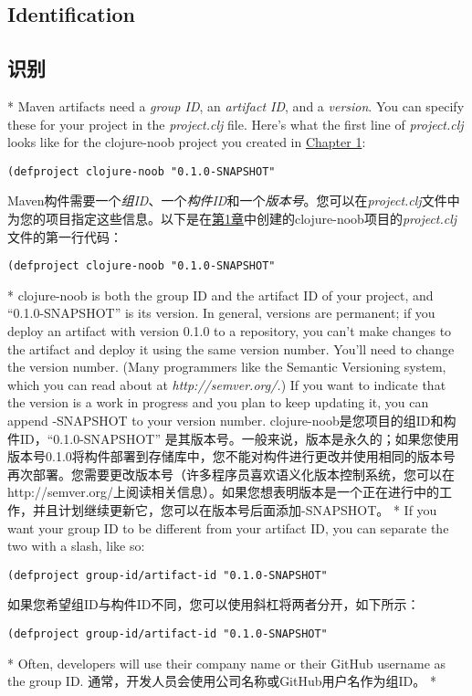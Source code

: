 \begin{paracol}{2}
\subsection{Identification}
\switchcolumn
\subsection{识别}
\switchcolumn[0]*
Maven artifacts need a \emph{group ID}, an \emph{artifact ID}, and a
\emph{version}. You can specify these for your project in the
\emph{project.clj} file. Here's what the first line of
\emph{project.clj} looks like for the clojure-noob project you created
in \href{javascript:void(0)}{Chapter 1}:
\begin{verbatim}
(defproject clojure-noob "0.1.0-SNAPSHOT"
\end{verbatim}
\switchcolumn
Maven构件需要一个\emph{组ID}、一个\emph{构件ID}和一个\emph{版本号}。您可以在\emph{project.clj}文件中为您的项目指定这些信息。以下是在\href{javascript:void(0)}{第1章}中创建的clojure-noob项目的\emph{project.clj}文件的第一行代码：
\begin{verbatim}
(defproject clojure-noob "0.1.0-SNAPSHOT"
\end{verbatim}
\switchcolumn[0]*
clojure-noob is both the group ID and the artifact ID of your project,
and ``0.1.0-SNAPSHOT'' is its version. In general, versions are permanent;
if you deploy an artifact with version 0.1.0 to a repository, you can't
make changes to the artifact and deploy it using the same version
number. You'll need to change the version number. (Many programmers like
the Semantic Versioning system, which you can read about at
\emph{http://semver.org/.}) If you want to indicate that the version is
a work in progress and you plan to keep updating it, you can append
-SNAPSHOT to your version number.
\switchcolumn
clojure-noob是您项目的组ID和构件ID，``0.1.0-SNAPSHOT'' 是其版本号。一般来说，版本是永久的；如果您使用版本号0.1.0将构件部署到存储库中，您不能对构件进行更改并使用相同的版本号再次部署。您需要更改版本号（许多程序员喜欢语义化版本控制系统，您可以在http://semver.org/上阅读相关信息）。如果您想表明版本是一个正在进行中的工作，并且计划继续更新它，您可以在版本号后面添加-SNAPSHOT。
\switchcolumn[0]*
If you want your group ID to be different from your artifact ID, you can
separate the two with a slash, like so:
\begin{verbatim}
(defproject group-id/artifact-id "0.1.0-SNAPSHOT"
\end{verbatim}
\switchcolumn
如果您希望组ID与构件ID不同，您可以使用斜杠将两者分开，如下所示：
\begin{verbatim}
(defproject group-id/artifact-id "0.1.0-SNAPSHOT"
\end{verbatim}
\switchcolumn[0]*
Often, developers will use their company name or their GitHub username
as the group ID.
\switchcolumn
通常，开发人员会使用公司名称或GitHub用户名作为组ID。
\switchcolumn[0]*

\end{paracol}
